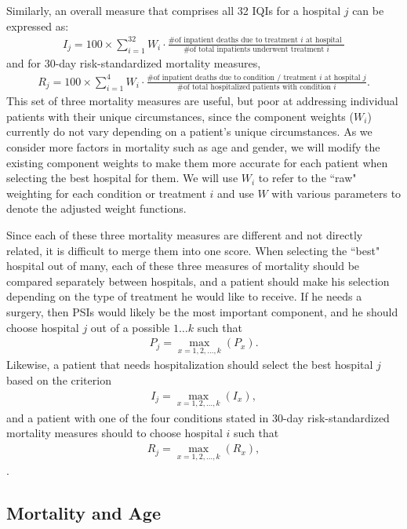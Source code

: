 \documentclass{article}
\begin{document}
Similarly, an overall measure that comprises all 32 IQIs for a hospital $j$ can be expressed as:
\begin{gather}I_j = 100 \times \sum_{i=1}^{32} W_i \cdot \frac{\text{\# of inpatient deaths due to treatment $i$ at hospital } }{\text{\# of total inpatients underwent treatment }i}
\end{gather}
and for 30-day risk-standardized mortality measures,
\begin{gather}R_j = 100 \times \sum_{i=1}^{4} W_i \cdot \frac{\text{\# of inpatient deaths due to condition / treatment $i$ at hospital } j}{\text{\# of total hospitalized patients with condition }i}.
\end{gather}
This set of three mortality measures are useful, but poor at addressing individual patients with their unique circumstances, since the component weights ($W_i$) currently do not vary depending on a patient's unique circumstances. As we consider more factors in mortality such as age and gender, we will modify the existing component weights to make them more accurate for each patient when selecting the best hospital for them. We will use $W_i$ to refer to the ``raw" weighting for each condition or treatment $i$ and use $W$ with various parameters to denote the adjusted weight functions.

Since each of these three mortality measures are different and not directly related, it is difficult to merge them into one score. When selecting the ``best" hospital out of many, each of these three measures of mortality should be compared separately between hospitals, and a patient should make his selection depending on the type of treatment he would like to receive. If he needs a surgery, then PSIs would likely be the most important component, and he should choose hospital $j$ out of a possible $1\dots k$ such that 
\begin{gather}P_j = \max_{x=1,2,\dots,k}(P_x).\end{gather}
Likewise, a patient that needs hospitalization should select the best hospital $j$ based on the criterion 
\begin{gather}I_j = \max_{x=1,2,\dots,k}(I_x),\end{gather}
and a patient with one of the four conditions stated in 30-day risk-standardized mortality measures should to choose hospital $i$ such that
\begin{gather}R_j = \max_{x=1,2,\dots,k}(R_x),\end{gather}.

\subsection{Mortality and Age}
\end{document}
